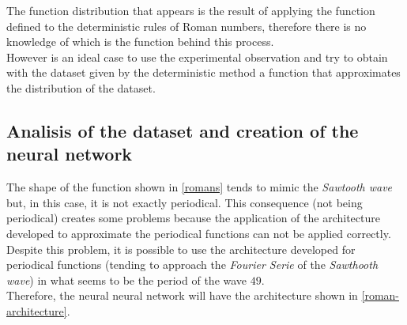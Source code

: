 \documentclass[a4paper, 11pt]{article}
\begin{document}
The function distribution that appears is the result of applying the function defined to the deterministic rules of Roman numbers, therefore there is no knowledge of which is the function behind this process.\\
However is an ideal case to use the experimental observation and try to obtain with the dataset given by the deterministic method a function that approximates the distribution of the dataset.

\subsection{Analisis of the dataset and creation of the neural network} 
The shape of the function shown in \ref{romans} tends to mimic the \textit{Sawtooth wave} but, in this case, it is not exactly periodical. This consequence (not being periodical) creates some problems because the application of the architecture developed to approximate the periodical functions can not be applied correctly.\\
Despite this problem, it is possible to use the architecture developed for periodical functions (tending to approach the \textit{Fourier Serie} of the \textit{Sawthooth wave}) in what seems to be the period of the wave $49$. \\
Therefore, the neural neural network will have the architecture shown in \ref{roman-architecture}.
\end{document}
